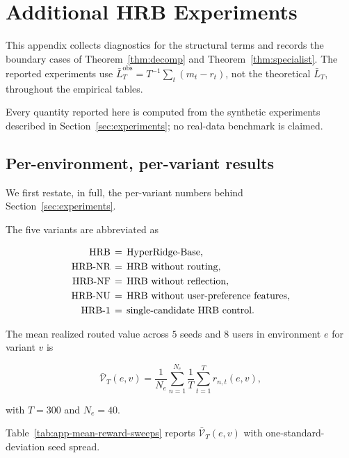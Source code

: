 \documentclass{article} %
\begin{document}
\section{Additional HRB Experiments}

\label{app:experiments}

This appendix collects diagnostics for the structural terms and records the
boundary cases of Theorem~\ref{thm:decomp} and
Theorem~\ref{thm:specialist}. The reported experiments use
\(\bar L_T^{\mathrm{obs}}=T^{-1}\sum_t(m_t-r_t)\), not the theoretical
\(\bar L_T\), throughout the empirical tables.

Every quantity reported here is computed from the synthetic experiments described in Section~\ref{sec:experiments}; no real-data benchmark is claimed.

\subsection{Per-environment, per-variant results}

\label{app:per-variant}

We first restate, in full, the per-variant numbers behind Section~\ref{sec:experiments}.

The five variants are abbreviated as

\begin{equation}
\label{eq:app-variants}
\begin{aligned}
\mathrm{HRB} &\,=\, \text{HyperRidge-Base},\\
\textnormal{HRB-NR} &\,=\, \text{HRB without routing},\\
\textnormal{HRB-NF} &\,=\, \text{HRB without reflection},\\
\textnormal{HRB-NU} &\,=\, \text{HRB without user-preference features},\\
\textnormal{HRB-1} &\,=\, \text{single-candidate HRB control}.
\end{aligned}
\end{equation}

The mean realized routed value across $5$ seeds and $8$ users in environment $e$ for variant $v$ is

\begin{equation}
\label{eq:app-mean-reward-def}
\bar{\mathcal{V}}_T(e,v) = \frac{1}{N_e}\sum_{n=1}^{N_e}\frac{1}{T}\sum_{t=1}^{T}r_{n,t}(e,v),
\end{equation}

with $T=300$ and $N_e=40$.

Table~\ref{tab:app-mean-reward-sweeps} reports $\bar{\mathcal{V}}_T(e,v)$ with one-standard-deviation seed spread.
\end{document}
